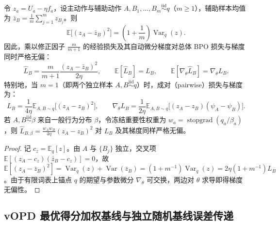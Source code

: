 \documentclass[lang=cn,scheme=chinese,openany]{elegantbook}
\newcommand{\E}{\mathbb E}
\newcommand{\Var}{\operatorname{Var}}
\newcommand{\sg}{\operatorname{stopgrad}}
\begin{document}
\begin{theorem}
\label{est:bpo-sampling}
令 $z_a=U_a-\eta f_a$，设主动作与辅助动作 $A,B_1,\ldots,B_m\overset{\mathrm{iid}}{\sim}q$（$m\ge 1$），辅助样本均值为 $\bar z_B=\frac1m\sum_{j=1}^m z_{B_j}$。则
\begin{equation}
\E\bigl[(z_A-\bar z_B)^2\bigr]=\left(1+\frac1m\right)\Var_q(z).
\end{equation}
因此，乘以修正因子 $\frac{m}{m+1}$ 的经验损失及其自动微分梯度对总体 BPO 损失与梯度同时严格无偏：
\begin{equation}
\widehat L_B=\frac{m}{m+1}\frac{(z_A-\bar z_B)^2}{2\eta},\qquad
\E[\widehat L_B]=L_B,\qquad \E[\nabla_\theta\widehat L_B]=\nabla_\theta L_B.
\end{equation}
特别地，当 $m=1$（即两个独立样本 $A,B\overset{\mathrm{iid}}{\sim}q$）时，成对（pairwise）损失与梯度为：
\begin{equation}
L_B=\frac1{4\eta}\E_{A,B\sim q}\bigl[(z_A-z_B)^2\bigr],\qquad
\nabla_\theta L_B=\frac1{2\eta}\E_{A,B\sim q}\bigl[(z_A-z_B)(\psi_A-\psi_B)\bigr].
\end{equation}
若 $A,B\overset{\mathrm{iid}}{\sim}\beta$ 来自一般行为分布 $\beta$，令冻结重要性权重为 $w_a=\sg(q_a/\beta_a)$，则 $\widehat L_{B,\beta}=\frac{w_A w_B}{4\eta}(z_A-z_B)^2$ 对 $L_B$ 及其梯度同样严格无偏。
\end{theorem}
\begin{proof}
记 $c_z=\E_q[z]$。由 $A$ 与 $\{B_j\}$ 独立，交叉项 $\E[(z_A-c_z)(\bar z_B-c_z)]=0$，故 $\E[(z_A-\bar z_B)^2]=\Var_q(z)+\Var(\bar z_B)=(1+m^{-1})\Var_q(z)=2\eta(1+m^{-1})L_B$。由于有限词表上锚点 $q$ 的期望与参数微分 $\nabla_\theta$ 可交换，两边对 $\theta$ 求导即得梯度无偏性。
\end{proof}

\subsection{vOPD 最优得分加权基线与独立随机基线误差传递}
\end{document}
